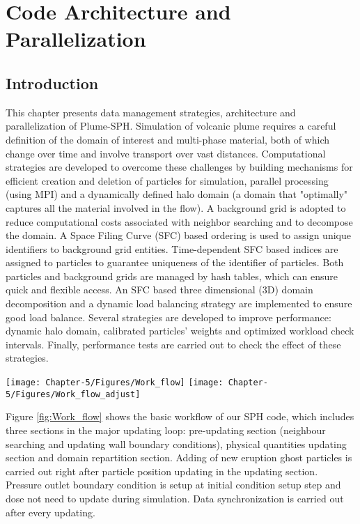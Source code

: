 \chapter{Code Architecture and Parallelization} \label{chapter:architecture-parallelism}

\section{Introduction}
\label{sect:introduction}
This chapter presents data management strategies, architecture and parallelization of Plume-SPH.
Simulation of volcanic plume requires a careful definition of the domain of interest and multi-phase material, both of which change over time and involve transport over vast distances.
Computational strategies are developed to overcome these challenges by building mechanisms for efficient creation and deletion of particles for simulation, parallel processing (using MPI) and a dynamically defined halo domain (a domain that "optimally" captures all the material involved in the flow).
A background grid is adopted to reduce computational costs associated with neighbor searching and to decompose the domain. A Space Filing Curve (SFC) based ordering is used to assign unique identifiers to background grid entities. Time-dependent SFC based indices are assigned to particles to guarantee uniqueness of the identifier of particles. Both particles and background grids are managed by hash tables, which can ensure quick and flexible access. An SFC based three dimensional (3D) domain decomposition and a dynamic load balancing strategy are implemented to ensure good load balance. Several strategies are developed to improve performance: dynamic halo domain, calibrated particles' weights and optimized workload check intervals. 
Finally, performance tests are carried out to check the effect of these strategies.

\begin{figure*}
\centering
\texttt{[image: Chapter-5/Figures/Work\_flow]}
\hfil
\texttt{[image: Chapter-5/Figures/Work\_flow\_adjust]}
\caption{Workflow for SPH code. Figure to the left is the basic workflow. The right figure is the workflow that enables dynamic halo domain. These steps in orange boxes are newly added steps. Extra computational costs associated with these extra steps are shown to be neglectable in section \ref{sec:effect-of-halo-domain}}
\label{fig:Work_flow}
\end{figure*}

Figure \ref{fig:Work_flow} shows the basic workflow of our SPH code, which includes three sections in the major updating loop: pre-updating section (neighbour searching and updating wall boundary conditions), physical quantities updating section and domain repartition section. Adding of new eruption ghost particles is carried out right after particle position updating in the updating section. Pressure outlet boundary condition is setup at initial condition setup step and dose not need to update during simulation. Data synchronization is carried out after every updating.

